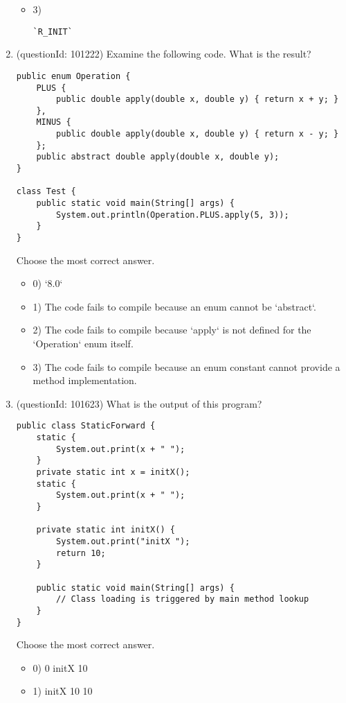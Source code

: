 \documentclass[12pt]{article}
\begin{document}
\begin{enumerate}[label=(\arabic*)]
\begin{itemize}
\item 3) \begin{verbatim}`R_INIT`\end{verbatim}

\end{itemize}
\item (questionId: 101222) Examine the following code. What is the result?
\begin{verbatim}
public enum Operation {
    PLUS {
        public double apply(double x, double y) { return x + y; }
    },
    MINUS {
        public double apply(double x, double y) { return x - y; }
    };
    public abstract double apply(double x, double y);
}

class Test {
    public static void main(String[] args) {
        System.out.println(Operation.PLUS.apply(5, 3));
    }
}
\end{verbatim}
Choose the most correct answer. 
\begin{itemize}
\item 0) `8.0`

\item 1) The code fails to compile because an enum cannot be `abstract`.

\item 2) The code fails to compile because `apply` is not defined for the `Operation` enum itself.

\item 3) The code fails to compile because an enum constant cannot provide a method implementation.

\end{itemize}
\item (questionId: 101623) What is the output of this program?\n\begin{verbatim}
public class StaticForward {
    static {
        System.out.print(x + " ");
    }
    private static int x = initX();
    static {
        System.out.print(x + " ");
    }

    private static int initX() {
        System.out.print("initX ");
        return 10;
    }

    public static void main(String[] args) {
        // Class loading is triggered by main method lookup
    }
}
\end{verbatim}
Choose the most correct answer. 
\begin{itemize}
\item 0) 0 initX 10

\item 1) initX 10 10


\end{itemize}
\end{enumerate}
\end{document}
